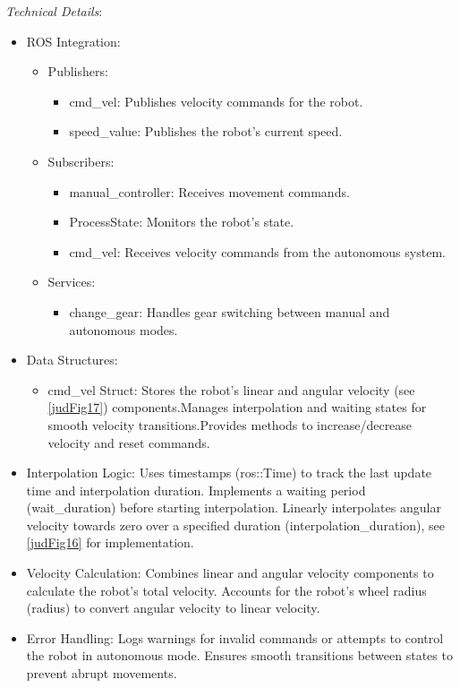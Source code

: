 \documentclass[../../main]{subfiles}
\begin{document}
\emph{Technical Details}:

\begin{itemize}
\item
  ROS Integration:

  \begin{itemize}
  \item
    Publishers:

    \begin{itemize}
    \item
      cmd\_vel: Publishes velocity commands for the robot.
    \item
      speed\_value: Publishes the robot's current speed.
    \end{itemize}
  \item
    Subscribers:

    \begin{itemize}
    \item
      manual\_controller: Receives movement commands.
    \item
      ProcessState: Monitors the robot's state.
    \item
      cmd\_vel: Receives velocity commands from the autonomous system.
    \end{itemize}
  \item
    Services:

    \begin{itemize}
    \item
      change\_gear: Handles gear switching between manual and autonomous
      modes.
    \end{itemize}
  \end{itemize}
\item
  Data Structures:

  \begin{itemize}
  \item
    cmd\_vel Struct: Stores the robot's linear and angular velocity (see
    \cref{judFig17}) components.Manages interpolation and waiting states for
    smooth velocity transitions.Provides methods to increase/decrease
    velocity and reset commands.
  \end{itemize}
\item
  Interpolation Logic: Uses timestamps (ros::Time) to track the last
  update time and interpolation duration. Implements a waiting period
  (wait\_duration) before starting interpolation. Linearly interpolates
  angular velocity towards zero over a specified duration
  (interpolation\_duration), see \cref{judFig16} for implementation.
\item
  Velocity Calculation: Combines linear and angular velocity components
  to calculate the robot's total velocity. Accounts for the robot's
  wheel radius (radius) to convert angular velocity to linear velocity.
\item
  Error Handling: Logs warnings for invalid commands or attempts to
  control the robot in autonomous mode. Ensures smooth transitions
  between states to prevent abrupt movements.
\end{itemize}
\end{document}
